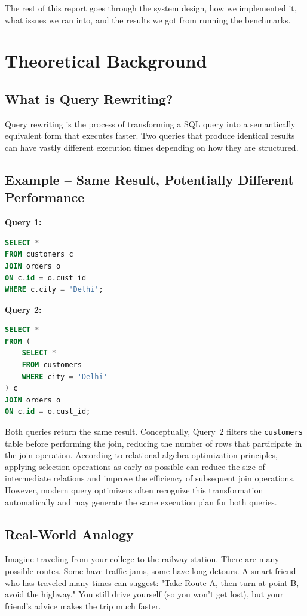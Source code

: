 \documentclass[12pt,a4paper]{article}
\begin{document}
The rest of this report goes through the system design, how we implemented it, what issues we ran into, and the results we got from running the benchmarks.

\section{Theoretical Background}

\subsection{What is Query Rewriting?}
Query rewriting is the process of transforming a SQL query into a semantically equivalent form that executes faster. Two queries that produce identical results can have vastly different execution times depending on how they are structured.

\subsection{Example -- Same Result, Potentially Different Performance}

\hspace{.4cm} \textbf{Query 1:}

\begin{lstlisting}[language=SQL,basicstyle=\ttfamily\small]
SELECT *
FROM customers c
JOIN orders o
ON c.id = o.cust_id
WHERE c.city = 'Delhi';
\end{lstlisting}

\textbf{Query 2:}

\begin{lstlisting}[language=SQL,basicstyle=\ttfamily\small]
SELECT *
FROM (
    SELECT *
    FROM customers
    WHERE city = 'Delhi'
) c
JOIN orders o
ON c.id = o.cust_id;
\end{lstlisting}

Both queries return the same result. Conceptually, Query~2 filters the
\texttt{customers} table before performing the join, reducing the number
of rows that participate in the join operation. According to relational
algebra optimization principles, applying selection operations as early
as possible can reduce the size of intermediate relations and improve
the efficiency of subsequent join operations. However, modern query
optimizers often recognize this transformation automatically and may
generate the same execution plan for both queries.


\subsection{Real-World Analogy}
Imagine traveling from your college to the railway station. There are many possible routes. Some have traffic jams, some have long detours. A smart friend who has traveled many times can suggest: "Take Route A, then turn at point B, avoid the highway." You still drive yourself (so you won't get lost), but your friend's advice makes the trip much faster.
\end{document}
